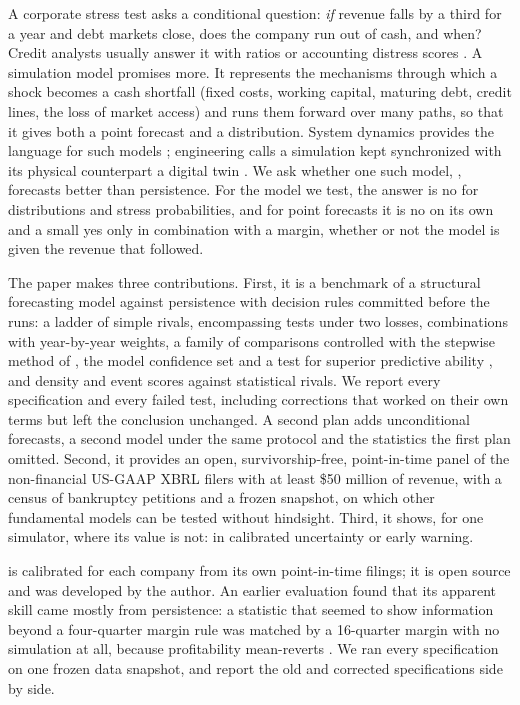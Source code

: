 \documentclass[preprint,12pt,authoryear]{elsarticle}
\newif\ifanon\anonfalse
\newcommand{\twin}{\ifanon\textsc{Sim}\else\twinname\fi}
\newcommand{\selfcitep}{\ifanon\citep{anon2026}\else\citep{dimakopoulos2026}\fi}
\newcommand{\twinname}{FinTwin}
\begin{document}
A corporate stress test asks a conditional question: \emph{if} revenue falls by a third for a year and debt markets close, does the company run out of cash, and when? Credit analysts usually answer it with ratios or accounting distress scores \citep{beaver1966,altman1968,ohlson1980,zmijewski1984}. A simulation model promises more. It represents the mechanisms through which a shock becomes a cash shortfall (fixed costs, working capital, maturing debt, credit lines, the loss of market access) and runs them forward over many paths, so that it gives both a point forecast and a distribution. System dynamics provides the language for such models \citep{forrester1961,sterman2000}; engineering calls a simulation kept synchronized with its physical counterpart a digital twin \citep{grieves2017,tao2019,kritzinger2018}. We ask whether one such model, \twin{}, forecasts better than persistence. For the model we test, the answer is no for distributions and stress probabilities, and for point forecasts it is no on its own and a small yes only in combination with a margin, whether or not the model is given the revenue that followed.

The paper makes three contributions. First, it is a benchmark of a structural forecasting model against persistence with decision rules committed before the runs: a ladder of simple rivals, encompassing tests under two losses, combinations with year-by-year weights, a family of comparisons controlled with the stepwise method of \citet{romano2005}, the model confidence set \citep{hansen2011} and a test for superior predictive ability \citep{hansen2005}, and density and event scores against statistical rivals. We report every specification and every failed test, including corrections that worked on their own terms but left the conclusion unchanged. A second plan adds unconditional forecasts, a second model under the same protocol and the statistics the first plan omitted. Second, it provides an open, survivorship-free, point-in-time panel of the non-financial US-GAAP XBRL filers with at least \$50 million of revenue, with a census of bankruptcy petitions and a frozen snapshot, on which other fundamental models can be tested without hindsight. Third, it shows, for one simulator, where its value is not: in calibrated uncertainty or early warning.

\twin{} is calibrated for each company from its own point-in-time filings; it is open source\ifanon\else{} and was developed by the author\fi. An earlier evaluation \selfcitep{} found that its apparent skill came mostly from persistence: a statistic that seemed to show information beyond a four-quarter margin rule was matched by a 16-quarter margin with no simulation at all, because profitability mean-reverts \citep{fama2000}. We ran every specification on one frozen data snapshot, and report the old and corrected specifications side by side.
\end{document}
